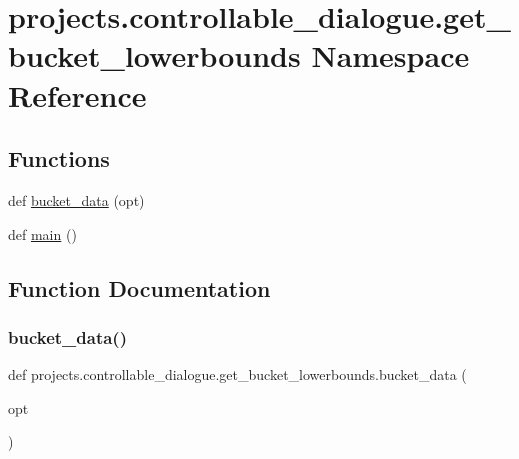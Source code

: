 \hypertarget{namespaceprojects_1_1controllable__dialogue_1_1get__bucket__lowerbounds}{}\section{projects.\+controllable\+\_\+dialogue.\+get\+\_\+bucket\+\_\+lowerbounds Namespace Reference}
\label{namespaceprojects_1_1controllable__dialogue_1_1get__bucket__lowerbounds}
\subsection*{Functions}
\begin{DoxyCompactItemize}
\item 
def \hyperlink{namespaceprojects_1_1controllable__dialogue_1_1get__bucket__lowerbounds_aeba9a3a9932797d722c5ff9d0991a87e}{bucket\+\_\+data} (opt)
\item 
def \hyperlink{namespaceprojects_1_1controllable__dialogue_1_1get__bucket__lowerbounds_a872417720ce8a3ff988a11d934afbda8}{main} ()
\end{DoxyCompactItemize}


\subsection{Function Documentation}
\mbox{\label{namespaceprojects_1_1controllable__dialogue_1_1get__bucket__lowerbounds_aeba9a3a9932797d722c5ff9d0991a87e}} 
\subsubsection{\texorpdfstring{bucket\+\_\+data()}{bucket\_data()}}
{\footnotesize\ttfamily def projects.\+controllable\+\_\+dialogue.\+get\+\_\+bucket\+\_\+lowerbounds.\+bucket\+\_\+data (\begin{DoxyParamCaption}\item[{}]{opt }\end{DoxyParamCaption})}



